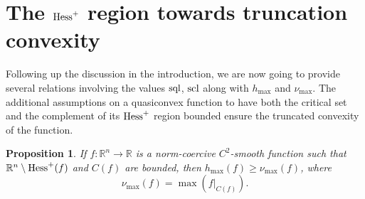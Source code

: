 \documentclass[12pt,twoside,reqno]{amsart}
\newtheorem{proposition}{Proposition}[section]
\theoremstyle{definition}
\numberwithin{equation}{section}
\begin{document}
\section{The ${\rm Hess}^+$ region towards truncation convexity}
Following up the discussion in the introduction, we are now going to provide several relations involving the values ${\rm sql}$, ${\rm scl}$ along with $h_{\max}$ and $\nu_{\max}$. The additional assumptions on a quasiconvex function to have both the critical set and the complement of its ${\rm Hess}^+$ region bounded ensure the truncated convexity of the function.
\begin{proposition}\label{prop19.10.2025.1}
If $f:\mathbb{R}^n\longrightarrow\mathbb{R}$ is a norm-coercive $C^2$-smooth function such that $\mathbb{R}^n\setminus {\rm Hess}^+(f)$ and $C(f)$ are bounded, 
then $h_{\max}(f)\geq \nu_{\max}(f)$, where 
\[
\nu_{\max}(f)=\max \left(f\big|_{C(f)}\right).
\]
\end{proposition}
\end{document}
